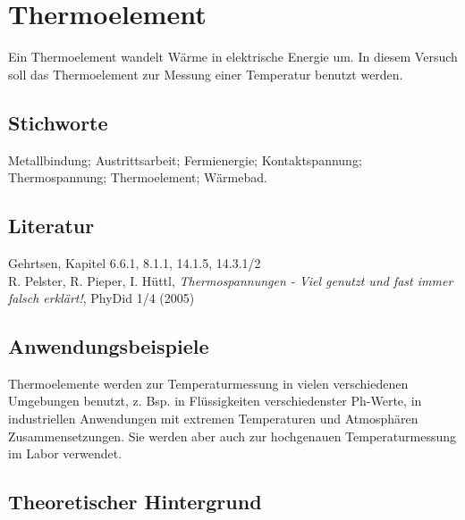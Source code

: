\chapter{Thermoelement}
\label{v:11}


Ein Thermoelement wandelt Wärme in elektrische Energie um. In diesem Versuch soll das Thermoelement zur Messung einer Temperatur benutzt werden.

\section{Stichworte}

Metallbindung; Austrittsarbeit; Fermienergie; Kontaktspannung; Thermospannung; Thermoelement; Wärmebad.
%
\section{Literatur}

Gehrtsen, Kapitel 6.6.1, 8.1.1, 14.1.5, 14.3.1/2\\
R. Pelster, R. Pieper, I. Hüttl, \textit{Thermospannungen - Viel genutzt und fast immer falsch erklärt!}, PhyDid 1/4 (2005)

\section{Anwendungsbeispiele}

Thermoelemente werden zur Temperaturmessung in vielen verschiedenen Umgebungen benutzt, z. Bsp. in Flüssigkeiten verschiedenster Ph-Werte, in industriellen Anwendungen mit extremen Temperaturen und Atmosphären Zusammensetzungen. Sie werden aber auch zur hochgenauen Temperaturmessung im Labor verwendet.

\section{Theoretischer Hintergrund}


